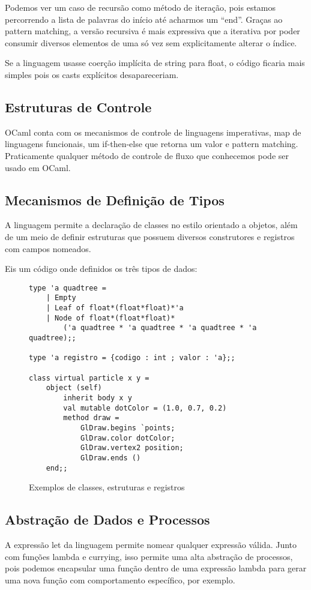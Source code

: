 \documentclass[a4paper,10pt]{article}
\begin{document}
		Podemos ver um caso de recursão como método de iteração, pois estamos percorrendo a lista de palavras do início até acharmos um ``end''. Graças ao pattern matching, a versão recursiva é mais expressiva que a iterativa por poder consumir diversos elementos de uma só vez sem explicitamente alterar o índice.
		
		Se a linguagem usasse coerção implícita de string para float, o código ficaria mais simples pois os casts explícitos desapareceriam.
		
	\subsection{Estruturas de Controle}
		OCaml conta com os mecanismos de controle de linguagens imperativas, map de linguagens funcionais, um if-then-else que retorna um valor e pattern matching. Praticamente qualquer método de controle de fluxo que conhecemos pode ser usado em OCaml.
		
	\subsection{Mecanismos de Definição de Tipos}
		A linguagem permite a declaração de classes no estilo orientado a objetos, além de um meio de definir estruturas que possuem diversos construtores e registros com campos nomeados. 
		
		Eis um código onde definidos os três tipos de dados:
		
		\begin{figure}[H]
	\begin{lstlisting}
type 'a quadtree =
	| Empty
	| Leaf of float*(float*float)*'a
	| Node of float*(float*float)*
		('a quadtree * 'a quadtree * 'a quadtree * 'a quadtree);;

type 'a registro = {codigo : int ; valor : 'a};;
	
class virtual particle x y =
	object (self)
		inherit body x y
		val mutable dotColor = (1.0, 0.7, 0.2)
		method draw =
			GlDraw.begins `points;
			GlDraw.color dotColor;
			GlDraw.vertex2 position;
			GlDraw.ends ()
	end;;

	\end{lstlisting}
		\caption{Exemplos de classes, estruturas e registros}
		\end{figure}
		
	\subsection{Abstração de Dados e Processos}
		A expressão let da linguagem permite nomear qualquer expressão válida. Junto com funções lambda e currying, isso permite uma alta abstração de processos, pois podemos encapsular uma função dentro de uma expressão lambda para gerar uma nova função com comportamento específico, por exemplo.
		
\end{document}
